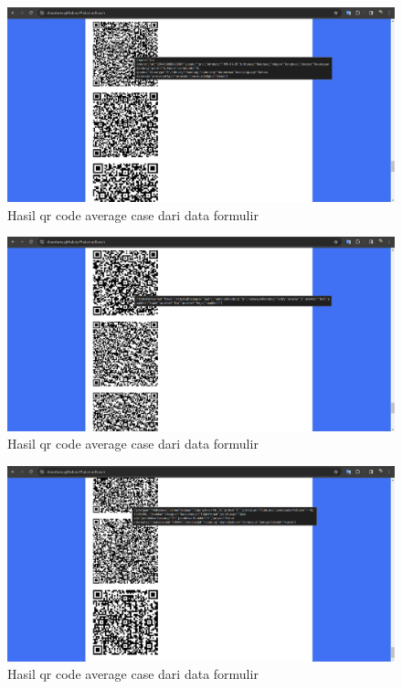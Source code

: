 \begin{figure}[H]
	\centering
	\includegraphics[scale=0.4]{Gambar/avg1.png}
	\caption{Hasil qr code average case dari data formulir} 
	\label{fig:formFullQRCode1}
\end{figure}

\begin{figure}[H]
	\centering
	\includegraphics[scale=0.4]{Gambar/avg2.png}
	\caption{Hasil qr code average case dari data formulir} 
	\label{fig:formFullQRCode2}
\end{figure}

\begin{figure}[H]
	\centering
	\includegraphics[scale=0.4]{Gambar/avg3.png}
	\caption{Hasil qr code average case dari data formulir} 
	\label{fig:formFullQRCode3}
\end{figure}

